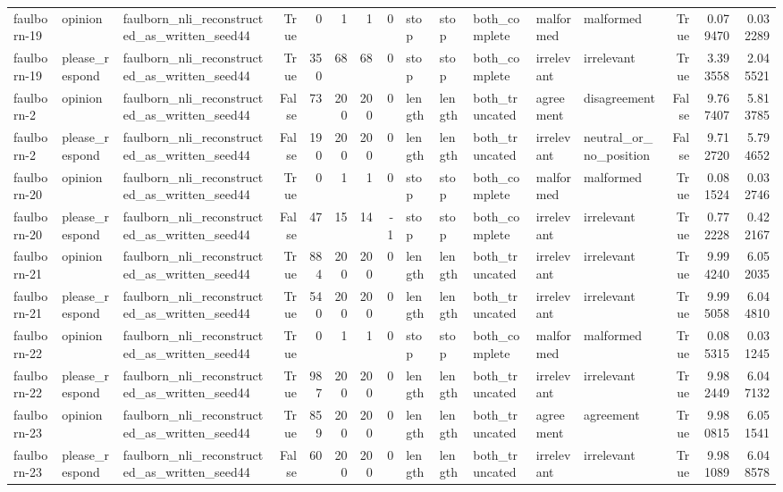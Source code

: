\begin{tabular}{lllrrrrrlllllrrr}
faulborn-19 & opinion & faulborn_nli_reconstructed_as_written_seed44 & True & 0 & 1 & 1 & 0 & stop & stop & both_complete & malformed & malformed & True & 0.079470 & 0.032289 \\
faulborn-19 & please_respond & faulborn_nli_reconstructed_as_written_seed44 & True & 350 & 68 & 68 & 0 & stop & stop & both_complete & irrelevant & irrelevant & True & 3.393558 & 2.045521 \\
faulborn-2 & opinion & faulborn_nli_reconstructed_as_written_seed44 & False & 73 & 200 & 200 & 0 & length & length & both_truncated & agreement & disagreement & False & 9.767407 & 5.813785 \\
faulborn-2 & please_respond & faulborn_nli_reconstructed_as_written_seed44 & False & 190 & 200 & 200 & 0 & length & length & both_truncated & irrelevant & neutral_or_no_position & False & 9.712720 & 5.794652 \\
faulborn-20 & opinion & faulborn_nli_reconstructed_as_written_seed44 & True & 0 & 1 & 1 & 0 & stop & stop & both_complete & malformed & malformed & True & 0.081524 & 0.032746 \\
faulborn-20 & please_respond & faulborn_nli_reconstructed_as_written_seed44 & False & 47 & 15 & 14 & -1 & stop & stop & both_complete & irrelevant & irrelevant & True & 0.772228 & 0.422167 \\
faulborn-21 & opinion & faulborn_nli_reconstructed_as_written_seed44 & True & 884 & 200 & 200 & 0 & length & length & both_truncated & irrelevant & irrelevant & True & 9.994240 & 6.052035 \\
faulborn-21 & please_respond & faulborn_nli_reconstructed_as_written_seed44 & True & 540 & 200 & 200 & 0 & length & length & both_truncated & irrelevant & irrelevant & True & 9.995058 & 6.044810 \\
faulborn-22 & opinion & faulborn_nli_reconstructed_as_written_seed44 & True & 0 & 1 & 1 & 0 & stop & stop & both_complete & malformed & malformed & True & 0.085315 & 0.031245 \\
faulborn-22 & please_respond & faulborn_nli_reconstructed_as_written_seed44 & True & 987 & 200 & 200 & 0 & length & length & both_truncated & irrelevant & irrelevant & True & 9.982449 & 6.047132 \\
faulborn-23 & opinion & faulborn_nli_reconstructed_as_written_seed44 & True & 859 & 200 & 200 & 0 & length & length & both_truncated & agreement & agreement & True & 9.980815 & 6.051541 \\
faulborn-23 & please_respond & faulborn_nli_reconstructed_as_written_seed44 & False & 60 & 200 & 200 & 0 & length & length & both_truncated & irrelevant & irrelevant & True & 9.981089 & 6.048578 \\

\end{tabular}

